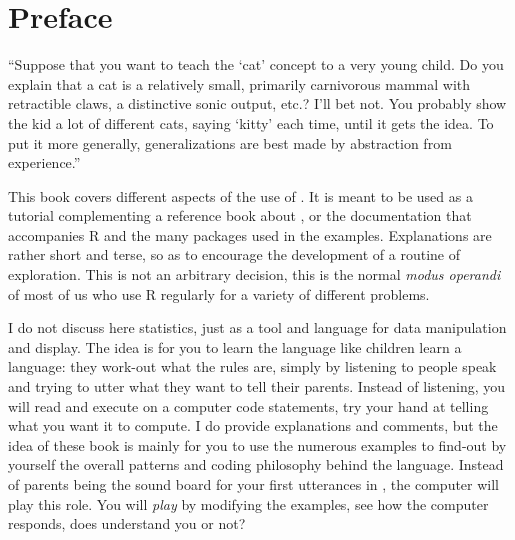 \chapter*{Preface}

\begin{VF}
``Suppose that you want to teach the `cat' concept to a very young child. Do you explain that a cat is a relatively small, primarily carnivorous mammal with retractible claws, a distinctive sonic output, etc.? I'll bet not. You probably show the kid a lot of different cats, saying `kitty' each time, until it gets the idea. To put it more generally, generalizations are best made by abstraction from experience.''

\end{VF}




\vspace{2ex}This book covers different aspects of the use of \Rpgrm. It is meant to be used as a tutorial complementing a reference book about \R, or the documentation that accompanies R and the many packages used in the examples. Explanations are rather short and terse, so as to encourage the development of a routine of exploration. This is not an arbitrary decision, this is the normal \emph{modus operandi} of most of us who use R regularly for a variety of different problems.

I do not discuss here statistics, just \Rpgrm as a tool and language for data manipulation and display. The idea is for you to learn the \Rpgrm language like children learn a language: they work-out what the rules are, simply by listening to people speak and trying to utter what they want to tell their parents. Instead of listening, you will read and execute on a computer \Rlang code statements, try your hand at telling \Rlang what you want it to compute. I do provide explanations and comments, but the idea of these book is mainly for you to use the numerous examples to find-out by yourself the overall patterns and coding philosophy behind the \Rlang language. Instead of parents being the sound board for your first utterances in , the computer will play this role. You will \emph{play} by modifying the examples, see how the computer responds, does \Rlang understand you or not?

